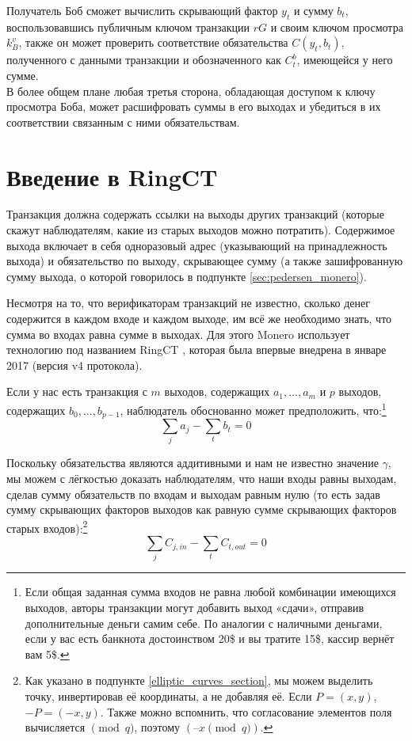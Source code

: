 Получатель Боб сможет вычислить скрывающий фактор $y_t$ и сумму $b_t$, воспользовавшись публичным ключом транзакции $r G$ и своим ключом просмотра $k_B^v$, также он может проверить соответствие обязательства $C(y_t, b_t)$, полученного с данными транзакции и обозначенного как $C_t^b$, имеющейся у него сумме.\\

В более общем плане любая третья сторона, обладающая доступом к ключу просмотра Боба, может расшифровать суммы в его выходах и убедиться в их соответствии связанным с ними обязательствам.



\section{Введение в RingCT}
\label{sec:ringct-introduction}

Транзакция должна содержать ссылки на выходы других транзакций (которые скажут наблю\-дателям, какие из старых выходов можно потратить). Содержимое выхода включает в себя одноразовый адрес (указывающий на принадлежность выхода) и обязательство по выходу, скрывающее сумму (а также зашифрованную сумму выхода, о которой говорилось в подпунк\-те \ref{sec:pedersen_monero}).

Несмотря на то, что верификаторам транзакций не известно, сколько денег содержится в каждом входе и каждом выходе, им всё же необходимо знать, что сумма во входах равна сумме в выходах. Для этого Monero использует технологию под названием RingCT \cite{MRL-0005-ringct}, которая была впервые внедрена в январе 2017 (версия v4 протокола).

Если у нас есть транзакция с $m$ выходов, содержащих \(a_1, ..., a_m\) и $p$ выходов, содержащих \(b_0, ..., b_{p-1}\), наблюдатель обоснованно может предположить, что:\footnote{Если общая заданная сумма входов не равна любой комбинации имеющихся выходов, авторы транзакции могут добавить выход «сдачи», отправив дополнительные деньги самим себе. По аналогии с наличными деньгами, если у вас есть банкнота достоинством 20\$ и вы тратите 15\$, кассир вернёт вам 5\$.}\vspace{.175cm}
\[\sum_j a_j - \sum_t b_t = 0\]

Поскольку обязательства являются аддитивными и нам не известно значение $\gamma$, мы можем с лёгкостью доказать наблюдателям, что наши входы равны выходам, сделав сумму обяза\-тельств по входам и выходам равным нулю (то есть задав сумму скрывающих факторов выходов как равную сумме скрывающих факторов старых входов):\footnote{Как указано в подпункте \ref{elliptic_curves_section}, мы можем выделить точку, инвертировав её координаты, а не добавляя её. Если $P = (x, y)$, $-P = (-x, y)$. Также можно вспомнить, что согласование элементов поля вычисляется $\pmod q$, поэтому $(–x \pmod q)$.}\vspace{.175cm}
\[\sum_{j}{C_{j, in}} - \sum_{t}{C_{t, out}} = 0\]

